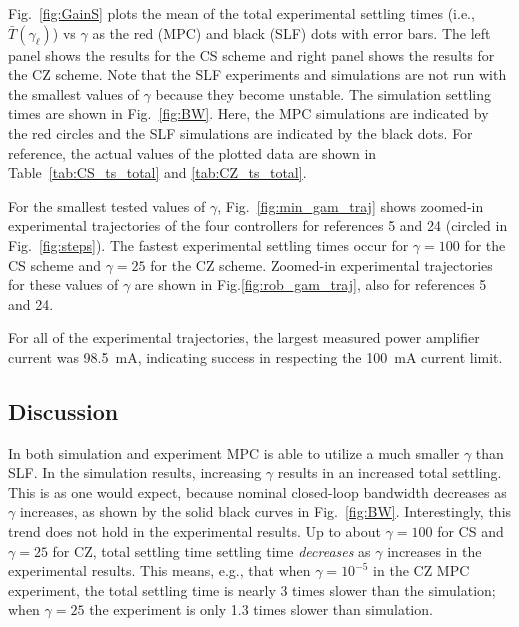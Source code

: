 \documentclass[twocolumn,twoside]{IEEEtran}
\begin{document}
Fig.~\ref{fig:GainS} plots the mean of the total experimental settling times (i.e., $\bar{T}(\gamma_{\ell})$) vs $\gamma$ as the red (MPC) and black (SLF) dots with error bars. The left panel shows the results for the CS scheme and right panel shows the results for the CZ scheme. Note that the SLF experiments and simulations are not run with the smallest values of $\gamma$ because they become unstable.
The simulation settling times are shown in Fig.~\ref{fig:BW}. Here, the MPC simulations are indicated by the red circles and the SLF simulations are indicated by the black dots.
For reference, the actual values of the plotted data are shown in Table~\ref{tab:CS_ts_total} and \ref{tab:CZ_ts_total}. 

For the smallest tested values of $\gamma$, Fig.~\ref{fig:min_gam_traj} shows zoomed-in experimental trajectories of the four controllers for references 5 and 24 (circled in Fig.~\ref{fig:steps}). The fastest experimental settling times occur for $\gamma=100$ for the CS scheme and $\gamma=25$ for the CZ scheme. Zoomed-in experimental trajectories for these values of $\gamma$ are shown in Fig.\ref{fig:rob_gam_traj}, also for references 5 and 24.

For all of the experimental trajectories, the largest measured power amplifier current was 98.5~mA, indicating success in respecting the 100~mA current limit.

\subsection{Discussion}\label{sec:res_disc}
In both simulation and experiment MPC is able to utilize a much smaller $\gamma$ than SLF. In the simulation results, increasing $\gamma$ results in an increased total settling. This is as one would expect, because nominal closed-loop bandwidth decreases as $\gamma$ increases, as shown by the solid black curves in Fig.~\ref{fig:BW}. Interestingly, this trend does not hold in the experimental results. Up to about ${\gamma=100}$ for CS and ${\gamma=25}$ for CZ, total settling time settling time \emph{decreases} as $\gamma$ increases in the experimental results. This means, e.g., that when ${\gamma=10^{-5}}$ in the CZ MPC experiment, the total settling time is nearly 3 times slower than the simulation; when ${\gamma=25}$ the experiment is only 1.3 times slower than simulation.
\end{document}
